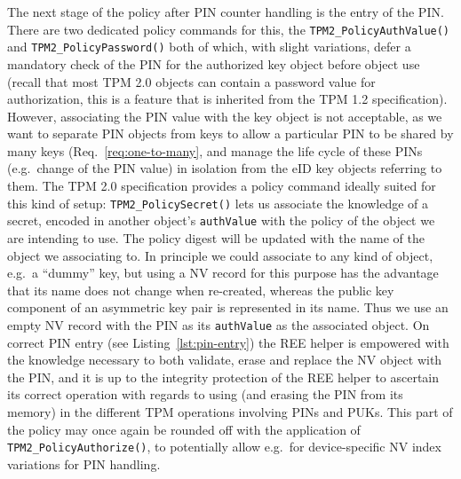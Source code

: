 \documentclass{sig-alternate-2013}
\begin{document}
The next stage of the policy after PIN counter handling is the entry of the
PIN\@. There are two dedicated policy commands for this, the
\texttt{TPM2\_PolicyAuthValue()} and \texttt{TPM2\_PolicyPassword()} both of
which, with slight variations, defer a mandatory check of the PIN for the
authorized key object before object use (recall that most TPM 2.0 objects can
contain a password value for authorization, this is a feature that is inherited
from the TPM 1.2 specification). However, associating the PIN value with the key
object is not acceptable, as we want to separate PIN objects from keys to allow
a particular PIN to be shared by many keys (Req.~\ref{req:one-to-many}, and
manage the life cycle of these PINs (e.g.\ change of the PIN value) in isolation
from the eID key objects referring to them. The TPM 2.0 specification provides a
policy command ideally suited for this kind of setup:
\texttt{TPM2\_PolicySecret()} lets us associate the knowledge of a secret,
encoded in another object's \texttt{authValue} with the policy of the object we
are intending to use. The policy digest will be updated with the name of the
object we associating to. In principle we could associate to any kind of object,
e.g.\ a ``dummy'' key, but using a NV record for this purpose has the advantage
that its name does not change when re-created, whereas the public key component
of an asymmetric key pair is represented in its name.  Thus we use an empty NV
record with the PIN as its \texttt{authValue} as the associated object. On
correct PIN entry (see Listing~\ref{lst:pin-entry}) the REE helper is empowered
with the knowledge necessary to both validate, erase and replace the NV object
with the PIN, and it is up to the integrity protection of the REE helper to
ascertain its correct operation with regards to using (and erasing the PIN from
its memory) in the different TPM operations involving PINs and
PUKs\footnotemark. This part of the policy may once again be rounded off with
the application of \texttt{TPM2\_PolicyAuthorize()}, to potentially allow e.g.\ for device-specific NV index
variations for PIN handling.
\end{document}
